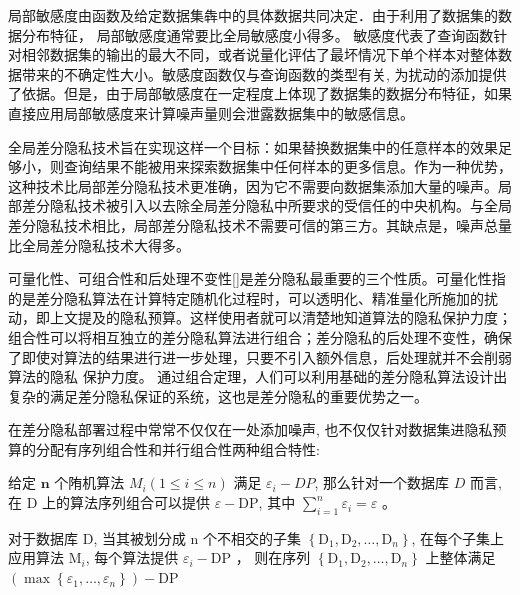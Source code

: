 局部敏感度由函数及给定数据集犇中的具体数据共同决定．由于利用了数据集的数据分布特征， 局部敏感度通常要比全局敏感度小得多。
敏感度代表了查询函数针对相邻数据集的输出的最大不同，或者说量化评估了最坏情况下单个样本对整体数据带来的不确定性大小。敏感度函数仅与查询函数的类型有关, 为扰动的添加提供了依据。但是，由于局部敏感度在一定程度上体现了数据集的数据分布特征，如果直接应用局部敏感度来计算噪声量则会泄露数据集中的敏感信息。

全局差分隐私技术旨在实现这样一个目标：如果替换数据集中的任意样本的效果足够小，则查询结果不能被用来探索数据集中任何样本的更多信息\cite{ref29}。作为一种优势，这种技术比局部差分隐私技术更准确，因为它不需要向数据集添加大量的噪声。局部差分隐私技术被引入以去除全局差分隐私中所要求的受信任的中央机构\cite{ref30}。与全局差分隐私技术相比，局部差分隐私技术不需要可信的第三方\cite{ref31}。其缺点是，噪声总量比全局差分隐私技术大得多。

可量化性、可组合性和后处理不变性[]是差分隐私最重要的三个性质。可量化性指的是差分隐私算法在计算特定随机化过程时，可以透明化、精准量化所施加的扰动，即上文提及的隐私预算。这样使用者就可以清楚地知道算法的隐私保护力度；组合性可以将相互独立的差分隐私算法进行组合；差分隐私的后处理不变性，确保了即使对算法的结果进行进一步处理，只要不引入额外信息，后处理就并不会削弱算法的隐私
保护力度。 通过组合定理，人们可以利用基础的差分隐私算法设计出复杂的满足差分隐私保证的系统，这也是差分隐私的重要优势之一。 

在差分隐私部署过程中常常不仅仅在一处添加噪声, 也不仅仅针对数据集进隐私预算的分配有序列组合性和并行组合性两种组合特性:

\begin{theorem}[串行组合]\label{串行组合}
给定 $\mathbf{n}$ 个陏机算法 $M_{i}(1 \leq i \leq n)$ 满足 $\varepsilon_{i}-DP$, 那么针对一个数据库 $D$ 而言, 在 $\mathrm{D}$ 上的算法序列组合可以提供 $\varepsilon-\mathrm{DP}$, 其中 $\sum_{i=1}^{n} \varepsilon_{i}=\varepsilon$ 。
\end{theorem}

\begin{theorem}[并行组合]\label{并行组合}
对于数据库 $\mathrm{D}$, 当其被划分成 $\mathrm{n}$ 个不相交的子集 $\left\{\mathrm{D}_{1}, \mathrm{D}_{2}, \ldots, \mathrm{D}_{n}\right\}$, 在每个子集上应用算法 $\mathrm{M}_{i}$, 每个算法提供 $\varepsilon_{i}-\mathrm{DP}$ ， 则在序列 $\left\{\mathrm{D}_{1}, \mathrm{D}_{2}, \ldots, \mathrm{D}_{n}\right\}$ 上整体满足 $\left(\max \left\{\varepsilon_{1}, \ldots, \varepsilon_{n}\right\}\right)-\mathrm{DP}$
\end{theorem}


